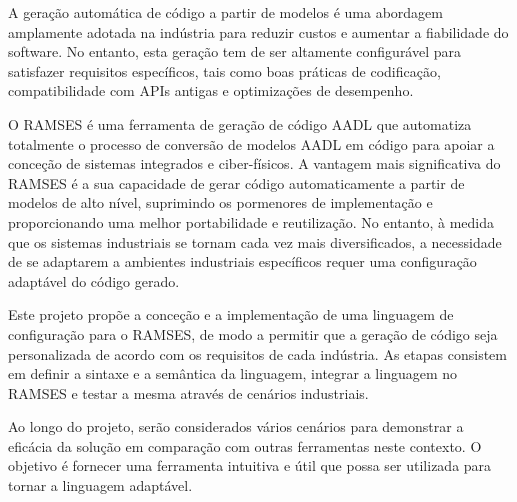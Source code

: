 
%

A geração automática de código a partir de modelos é uma abordagem amplamente adotada na indústria para reduzir custos e aumentar a fiabilidade do software. No entanto, esta geração tem de ser altamente configurável para satisfazer requisitos específicos, tais como boas práticas de codificação, compatibilidade com APIs antigas e optimizações de desempenho.

O RAMSES é uma ferramenta de geração de código AADL que automatiza totalmente o processo de conversão de modelos AADL em código para apoiar a conceção de sistemas integrados e ciber-físicos. A vantagem mais significativa do RAMSES é a sua capacidade de gerar código automaticamente a partir de modelos de alto nível, suprimindo os pormenores de implementação e proporcionando uma melhor portabilidade e reutilização. No entanto, à medida que os sistemas industriais se tornam cada vez mais diversificados, a necessidade de se adaptarem a ambientes industriais específicos requer uma configuração adaptável do código gerado.

Este projeto propõe a conceção e a implementação de uma linguagem de configuração para o RAMSES, de modo a permitir que a geração de código seja personalizada de acordo com os requisitos de cada indústria. As etapas consistem em definir a sintaxe e a semântica da linguagem, integrar a linguagem no RAMSES e testar a mesma através de cenários industriais.

Ao longo do projeto, serão considerados vários cenários para demonstrar a eficácia da solução em comparação com outras ferramentas neste contexto. O objetivo é fornecer uma ferramenta intuitiva e útil que possa ser utilizada para tornar a linguagem adaptável.


%
%

